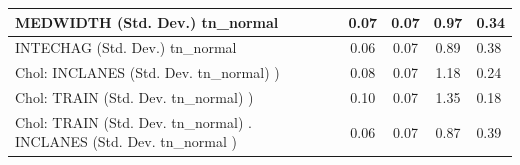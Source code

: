 \begin{table}
\begin{center}
\begin{tabular}{|l|l|c|c|c|l|}
			\hline
			MEDWIDTH (Std. Dev.) tn_normal &  & 0.07 & 0.07 & 0.97 & 0.34 \\
			\hline
			INTECHAG (Std. Dev.) tn_normal &  & 0.06 & 0.07 & 0.89 & 0.38 \\
			\hline
			 Chol: INCLANES (Std. Dev. tn_normal) ) &  & 0.08 & 0.07 & 1.18 & 0.24 \\
			\hline
			 Chol: TRAIN (Std. Dev. tn_normal) ) &  & 0.10 & 0.07 & 1.35 & 0.18 \\
			\hline
			 Chol: TRAIN (Std. Dev. tn_normal) . INCLANES (Std. Dev.   tn_normal ) &  & 0.06 & 0.07 & 0.87 & 0.39 \\
			\hline
		\end{tabular}
	\end{center}
\end{table}